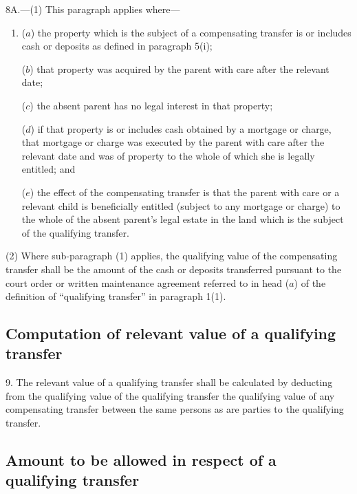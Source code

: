 \documentclass[12pt,a4paper]{article}
\begin{document}

\medskip

8A.—(1) This paragraph applies where—
\begin{enumerate}\item[]
($a$) the property which is the subject of a compensating transfer is or includes cash or deposits as defined in paragraph 5(i);

($b$) that property was acquired by the parent with care after the relevant date;

($c$) the absent parent has no legal interest in that property;

($d$) if that property is or includes cash obtained by a mortgage or charge, that mortgage or charge was executed by the parent with care after the relevant date and was of property to the whole of which she is legally entitled; and

($e$) the effect of the compensating transfer is that the parent with care or a relevant child is beneficially entitled (subject to any mortgage or charge) to the whole of the absent parent’s legal estate in the land which is the subject of the qualifying transfer.
\end{enumerate}

(2) Where sub-paragraph (1) applies, the qualifying value of the compensating transfer shall be the amount of the cash or deposits transferred pursuant to the court order or written maintenance agreement referred to in head ($a$) of the definition of “qualifying transfer” in paragraph 1(1).


\subsection*{Computation of relevant value of a qualifying transfer}

9.  The relevant value of a qualifying transfer shall be calculated by deducting from the qualifying value of the qualifying transfer the qualifying value of any compensating transfer between the same persons as are parties to the qualifying transfer.

\subsection*{Amount to be allowed in respect of a qualifying transfer}
\end{document}
